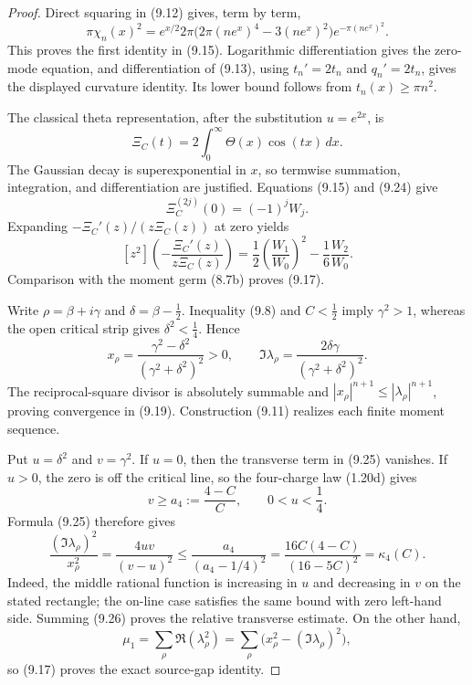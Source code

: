 \documentclass[11pt]{article}
\begin{document}
\begin{proof}
Direct squaring in \textup{(9.12)} gives, term by term,
\[
 \pi\chi_n(x)^2
 =e^{x/2}2\pi\bigl(2\pi(ne^x)^4-3(ne^x)^2\bigr)e^{-\pi(ne^x)^2}.
\]
This proves the first identity in \textup{(9.15)}.  Logarithmic differentiation gives the
zero-mode equation, and differentiation of \textup{(9.13)}, using $t_n'=2t_n$ and
$q_n'=2t_n$, gives the displayed curvature identity.  Its lower bound follows from
$t_n(x)\ge\pi n^2$.

The classical theta representation, after the substitution $u=e^{2x}$, is
\[
 \Xi_C(t)=2\int_0^\infty\Theta(x)\cos(tx)\,dx.
 \tag{9.24}
\]
The Gaussian decay is superexponential in $x$, so termwise summation, integration, and
differentiation are justified.  Equations \textup{(9.15)} and \textup{(9.24)} give
\[
 \Xi_C^{(2j)}(0)=(-1)^jW_j.
\]
Expanding $-\Xi_C'(z)/(z\Xi_C(z))$ at zero yields
\[
 [z^2]\left(-\frac{\Xi_C'(z)}{z\Xi_C(z)}\right)
 =\frac12\left(\frac{W_1}{W_0}\right)^2-\frac16\frac{W_2}{W_0}.
\]
Comparison with the moment germ \textup{(8.7b)} proves \textup{(9.17)}.

Write $\rho=\beta+i\gamma$ and $\delta=\beta-\frac12$.  Inequality \textup{(9.8)} and
$C<\frac12$ imply $\gamma^2>1$, whereas the open critical strip gives
$\delta^2<\frac14$.  Hence
\[
 x_\rho=\frac{\gamma^2-\delta^2}{(\gamma^2+\delta^2)^2}>0,\qquad
 \Im\lambda_\rho=\frac{2\delta\gamma}{(\gamma^2+\delta^2)^2}.
 \tag{9.25}
\]
The reciprocal-square divisor is absolutely summable and
$|x_\rho|^{n+1}\le|\lambda_\rho|^{n+1}$, proving convergence in \textup{(9.19)}.  Construction
\textup{(9.11)} realizes each finite moment sequence.

Put $u=\delta^2$ and $v=\gamma^2$.  If $u=0$, then the transverse term in
\textup{(9.25)} vanishes.  If $u>0$, the zero is off the critical line, so the four-charge law
\textup{(1.20d)} gives
\[
 v\ge a_4:=\frac{4-C}{C},
 \qquad 0<u<\frac14.
\]
Formula \textup{(9.25)} therefore gives
\[
 \frac{(\Im\lambda_\rho)^2}{x_\rho^2}
 =\frac{4uv}{(v-u)^2}
 \le\frac{a_4}{(a_4-1/4)^2}
 =\frac{16C(4-C)}{(16-5C)^2}=\kappa_4(C).
 \tag{9.26}
\]
Indeed, the middle rational function is increasing in $u$ and decreasing in $v$ on the stated
rectangle; the on-line case satisfies the same bound with zero left-hand side.  Summing
\textup{(9.26)} proves the relative transverse estimate.  On the other hand,
\[
 \mu_1=\sum_\rho\Re(\lambda_\rho^2)
 =\sum_\rho\bigl(x_\rho^2-(\Im\lambda_\rho)^2\bigr),
\]
so \textup{(9.17)} proves the exact source-gap identity.


\end{proof}
\end{document}
